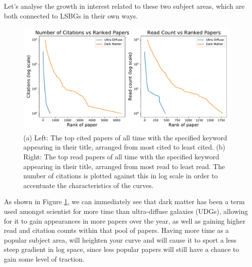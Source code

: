 \documentclass[10pt, letterpaper]{article}
\begin{document}
Let's analyse the growth in interest related to these two subject areas, which are both connected to LSBGs in their own ways.

\begin{figure}[H]
    \hspace*{-5mm}
        \centering
        \includegraphics[width =\textwidth]{citeAndRead.pdf}
        \caption{(a) Left: The top cited papers of all time with the specified keyword appearing in their title, arranged from most cited to least cited.  (b) Right: The top read papers of all time with the specified keyword appearing in their title, arranged from most read to least read. The number of citations is plotted against this in log scale in order to accentuate the characteristics of the curves.}
        \label{fig:y1}
\end{figure}

As shown in Figure \ref{fig:y1}, we can immediately see that dark matter has been a term used amongst scientist for more time than ultra-diffuse galaxies (UDGs), allowing for it to gain appearances in more papers over the year, as well as gaining higher read and citation counts within that pool of papers. Having more time as a popular subject area, will heighten your curve and will cause it to sport a less steep gradient in log space, since less popular papers will still have a chance to gain some level of traction.
\end{document}
